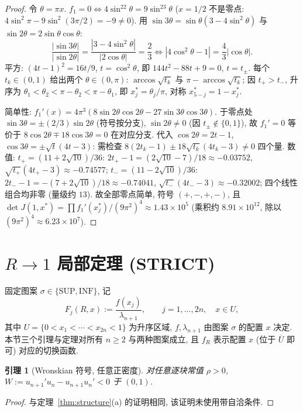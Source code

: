 \documentclass[UTF8]{ctexart}
\newtheorem{lemma}[theorem]{引理}
\begin{document}
\begin{proof}
令 $\theta=\pi x$. $f_1=0\iff4\sin^22\theta=9\sin^23\theta$ ($x=1/2$ 不是零点:
$4\sin^2\pi-9\sin^2(3\pi/2)=-9\neq0$). 用 $\sin3\theta=\sin\theta(3-4\sin^2\theta)$
与 $\sin2\theta=2\sin\theta\cos\theta$:
\begin{equation*}
	\frac{|\sin3\theta|}{|\sin2\theta|}=\frac{|3-4\sin^2\theta|}{|2\cos\theta|}=\frac23
	\iff |4\cos^2\theta-1|=\frac43|\cos\theta|.
\end{equation*}
平方: $(4t-1)^2=16t/9$, $t=\cos^2\theta$, 即 $144t^2-88t+9=0$,
$t=t_\pm$. 每个 $t_k\in(0,1)$ 给出两个 $\theta\in(0,\pi)$:
$\arccos\sqrt{t_k}$ 与 $\pi-\arccos\sqrt{t_k}$; 因 $t_+>t_-$, 升序为
$\theta_1<\theta_2<\pi-\theta_2<\pi-\theta_1$, 即 $x_j^*=\theta_j/\pi$,
对称 $x_{5-j}^*=1-x_j^*$.

简单性: $f_1'(x)=4\pi^3(8\sin2\theta\cos2\theta-27\sin3\theta\cos3\theta)$. 于零点处
$\sin3\theta=\pm(2/3)\sin2\theta$ (符号按分支), $\sin2\theta\neq0$ (因
$t_\pm\notin\{0,1\}$), 故 $f_1'=0$ 等价于 $8\cos2\theta\mp18\cos3\theta=0$
在对应分支. 代入 $\cos2\theta=2t-1$, $\cos3\theta=\pm\sqrt t(4t-3)$: 需检查
$8(2t_k-1)\pm18\sqrt{t_k}(4t_k-3)\neq0$ 四个量. 数值:
$t_+=(11+2\sqrt{10})/36$: $2t_+-1=(2\sqrt{10}-7)/18\approx-0.03752$,
$\sqrt{t_+}(4t_+-3)\approx-0.74577$; $t_-=(11-2\sqrt{10})/36$:
$2t_--1=-(7+2\sqrt{10})/18\approx-0.74041$, $\sqrt{t_-}(4t_--3)\approx-0.32002$;
四个线性组合均非零 (量级约 $13$). 故全部零点简单, 符号 $(+,-,+,-)$, 且
$\det J(1,x^*)=\prod f_1'(x_j^*)/(9\pi^2)^4\approx1.43\times10^5$
(乘积约 $8.91\times10^{12}$, 除以 $(9\pi^2)^4\approx6.23\times10^7$).
\end{proof}

\section{\texorpdfstring{$R\to1$}{R to 1} 局部定理 (STRICT)}\label{sec:local}

固定图案 $\sigma\in\{\mathrm{SUP},\mathrm{INF}\}$, 记
\begin{equation*}
	F_j(R,x):=\frac{f(x_j)}{\lambda_{n+1}},\qquad
	j=1,\dots,2n,\quad x\in U,
\end{equation*}
其中 $U=\{0<x_1<\cdots<x_{2n}<1\}$ 为升序区域, $f,\lambda_{n+1}$ 由图案
$\sigma$ 的配置 $x$ 决定. 本节三个引理与定理对所有 $n\ge2$ 与两种图案成立,
且 $f_R$ 表示配置 $x$ (位于 $\overline U$ 即可) 对应的切换函数.

\begin{lemma}[Wronskian 符号, 任意正密度]\label{lem:W}
对任意逐块常值 $\rho>0$, $W:=u_{n+1}'u_n-u_{n+1}u_n'<0$ 于 $(0,1)$.
\end{lemma}
\begin{proof}
与定理~\ref{thm:structure}(a) 的证明相同, 该证明未使用带自洽条件.
\end{proof}
\end{document}
